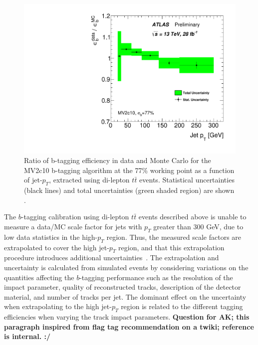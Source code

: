 \begin{figure}[!ht]
  \captionsetup[subfigure]{aboveskip=-5pt,justification=centering}
  \begin{center}
    \includegraphics[width=0.7\linewidth, angle=0]{figs/Objects/bjets_calib_pt.pdf} 
  \end{center}
  \caption[Ratio of b-tagging efficiency in data and Monte Carlo for the MV2c10 b-tagging algorithm at the 77\% working point as a function of jet-$p_T$,
    extracted using di-lepton $t\bar{t}$ events. Statistical uncertainties (black lines) and total uncertainties (green shaded region) are shown.]
          {Ratio of b-tagging efficiency in data and Monte Carlo for the MV2c10 b-tagging algorithm at the 77\% working point as a function of jet-$p_T$,
    extracted using di-lepton $t\bar{t}$ events. Statistical uncertainties (black lines) and total uncertainties (green shaded region) are shown \cite{obj-bjets_calib_plots}.}
  \label{fig:obj-bjets_calib}
\end{figure}

The $b$-tagging calibration using di-lepton $t\bar{t}$ events described above
is unable to measure a data/MC scale factor for jets with $p_T$ greater than 300 GeV, due to low data statistics in the high-$p_T$ region.
Thus, the measured scale factors are extrapolated to cover the high jet-$p_T$ region, and that this extrapolation procedure introduces additional uncertainties~\cite{obj-bjets_calib_highPt}.
The extrapolation and uncertainty is calculated from simulated events by considering variations on the quantities affecting the $b$-tagging performance
such as the resolution of the impact parameter, quality of reconstructed tracks, description of the detector material, and number of tracks per jet.
The dominant effect on the uncertainty when extrapolating to the high jet-$p_T$ region is related to the different tagging efficiencies
when varying the track impact parameters. 
\textbf{Question for AK; this paragraph inspired from flag tag recommendation on a twiki; reference is internal. :/}

